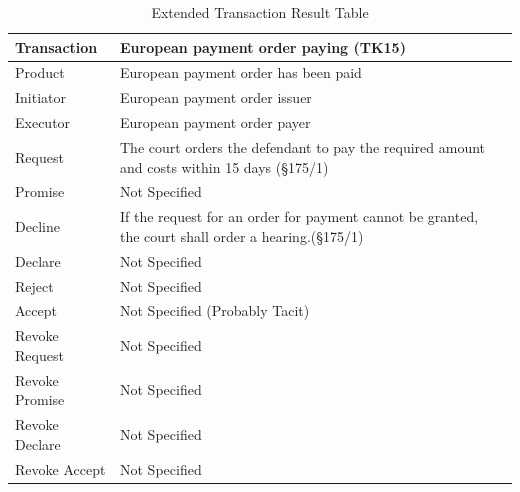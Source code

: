 \begin{landscape}
\begin{table}[h]
\caption{Extended Transaction Result Table}
\label{tab:etrt}
\begin{tabular}{|l||l|l|}
\hline
Transaction  &  European payment order paying (TK15) \\ \hline
Product      &  European payment order has been paid \\ \hline
Initiator      &  European payment order issuer \\ \hline
Executor       &  European payment order payer \\ \hline
Request        &   The court orders the defendant to pay the required amount and costs within 15 days  (\S175/1)
  \\ \hline
Promise        &    Not Specified   \\ \hline
Decline        &  If the request for an order for payment cannot be granted, the court shall order a hearing.(\S175/1)  \\ \hline
Declare        &  Not Specified  \\ \hline
Reject         &  Not Specified   \\ \hline
Accept         & Not Specified (Probably Tacit) \\ \hline
Revoke Request & Not Specified      \\ \hline
Revoke Promise & Not Specified  \\ \hline
Revoke Declare & Not Specified      \\ \hline
Revoke Accept  &  Not Specified \\ \hline
\end{tabular}
\end{table}


\end{landscape}
